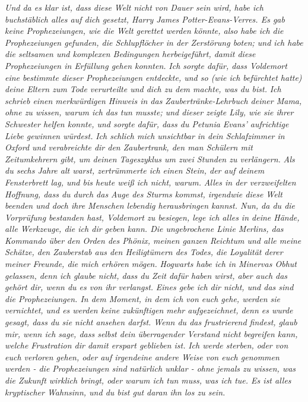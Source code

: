 \emph{Und da es klar ist, dass diese Welt nicht von Dauer sein wird, habe ich
buchstäblich alles auf dich gesetzt, Harry James Potter-Evans-Verres. Es gab
keine Prophezeiungen, wie die Welt gerettet werden könnte, also habe ich die
Prophezeiungen gefunden, die Schlupflöcher in der Zerstörung boten; und ich habe
die seltsamen und komplexen Bedingungen herbeigeführt, damit diese
Prophezeiungen in Erfüllung gehen konnten.} \emph{Ich sorgte dafür, dass
Voldemort eine bestimmte dieser Prophezeiungen entdeckte, und so (wie ich
befürchtet hatte) deine Eltern zum Tode verurteilte und dich zu dem machte, was
du bist.} \emph{Ich schrieb einen merkwürdigen Hinweis in das
Zaubertränke-Lehrbuch deiner Mama, ohne zu wissen, warum ich das tun musste;
und dieser zeigte Lily, wie sie ihrer Schwester helfen konnte, und sorgte dafür,
dass du Petunia Evans' aufrichtige Liebe gewinnen würdest.} \emph{Ich schlich
mich unsichtbar in dein Schlafzimmer in Oxford und verabreichte dir den
Zaubertrank, den man Schülern mit Zeitumkehrern gibt, um deinen Tageszyklus um
zwei Stunden zu verlängern.} \emph{Als du sechs Jahre alt warst, zertrümmerte
ich einen Stein, der auf deinem Fensterbrett lag, und bis heute weiß ich nicht,
warum.} \emph{Alles in der verzweifelten Hoffnung, dass du durch das Auge des
Sturms kommst, irgendwie diese Welt beenden und doch ihre Menschen lebendig
herausbringen kannst. Nun, da du die Vorprüfung bestanden hast, Voldemort zu
besiegen, lege ich alles in deine Hände, alle Werkzeuge, die ich dir geben kann.
Die ungebrochene Linie Merlins, das Kommando über den Orden des Phönix, meinen
ganzen Reichtum und alle meine Schätze, den Zauberstab aus den Heiligtümern des
Todes, die Loyalität derer meiner Freunde, die mich erhören mögen.} \emph{
Hogwarts habe ich in Minervas Obhut gelassen, denn ich glaube nicht, dass du
Zeit dafür haben wirst, aber auch das gehört dir, wenn du es von ihr verlangst.}
\emph{Eines gebe ich dir nicht, und das sind die Prophezeiungen. In dem Moment,
in dem ich von euch gehe, werden sie vernichtet, und es werden keine zukünftigen
mehr aufgezeichnet, denn es wurde gesagt, dass du sie nicht ansehen darfst. Wenn
du das frustrierend findest, glaub mir, wenn ich sage, dass selbst dein
überragender Verstand nicht begreifen kann, welche Frustration dir damit erspart
geblieben ist.} \emph{ Ich werde sterben, oder von euch verloren gehen, oder auf
irgendeine andere Weise von euch genommen werden - die Prophezeiungen sind
natürlich unklar - ohne jemals zu wissen, was die Zukunft wirklich bringt, oder
warum ich tun muss, was ich tue. Es ist alles kryptischer Wahnsinn, und du bist
gut daran ihn los zu sein.}


